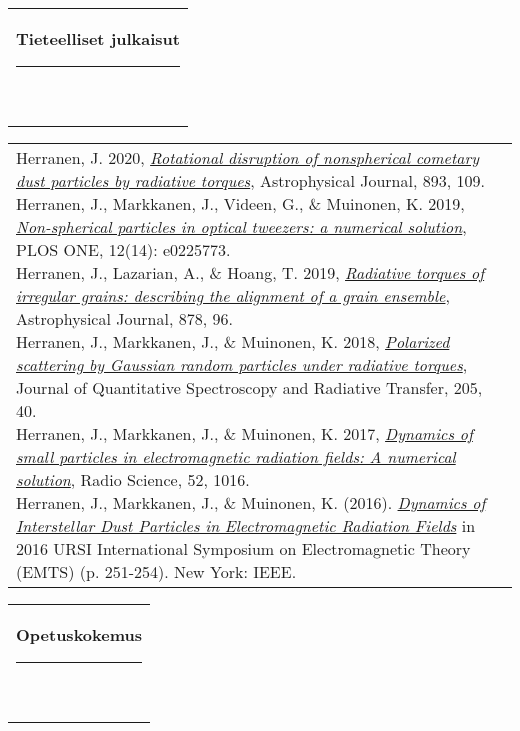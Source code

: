 \documentclass[11pt,A4]{article}
\newcommand{\mpwidth}{\linewidth-\fboxsep-\fboxsep}
\newcommand{\cvtext}[1] {
	\begin{tabular*}{1\mpwidth}{p{0.98\mpwidth}}
		\parbox{1\mpwidth}{#1}
	\end{tabular*}
}
\newcommand{\cvsection}[1] {
	\vspace{14pt}
	\cvtext{
		\textbf{\LARGE{\textcolor{darkcol}{{#1}}}}\\[-4pt]
		\textcolor{maincol}{ \rule{0.1\textwidth}{2pt} } \\
	}
}
\begin{document}
\begin{paracol}{2}
\begin{rightcolumn}
			\newpage
			\cvsection{Tieteelliset julkaisut}
			
			\cvtext{
				
				Herranen, J. 2020, \emph{\href{https://doi.org/10.3847/1538-4357/ab8009}{Rotational disruption of nonspherical cometary dust particles by radiative torques}}, Astrophysical Journal, 893, 109. \\[-5pt]
				
				Herranen, J., Markkanen, J., Videen, G., \& Muinonen, K. 2019, \emph{\href{https://doi.org/10.1371/journal.pone.0225773}{Non-spherical particles in optical tweezers: a numerical solution}}, PLOS ONE, 12(14): e0225773.\\[-5pt]
				
				Herranen, J., Lazarian, A., \& Hoang, T. 2019, \emph{\href{https://doi.org/10.3847\%2F1538-4357\%2Fab1eb3}{Radiative torques of irregular grains: describing the alignment of a grain ensemble}}, Astrophysical Journal, 878, 96.\\[-5pt]
				
				Herranen, J., Markkanen, J., \& Muinonen, K. 2018, \emph{\href{https://doi.org/10.1016/j.jqsrt.2017.09.033}{Polarized scattering by Gaussian random particles under radiative torques}}, Journal of Quantitative Spectroscopy and Radiative Transfer, 205, 40.\\[-5pt]
				
				Herranen, J., Markkanen, J., \& Muinonen, K. 2017, \emph{\href{https://doi.org/10.1002/2017RS006333}{Dynamics of small particles in electromagnetic radiation fields: A numerical solution}}, Radio Science, 52, 1016.\\[-5pt]
				
				Herranen, J., Markkanen, J., \& Muinonen, K. (2016). \emph{\href{https://doi.org/10.1109/URSI-EMTS.2016.7571366}{Dynamics of Interstellar Dust Particles in Electromagnetic Radiation Fields}} in 2016 URSI International Symposium on Electromagnetic Theory (EMTS) (p. 251-254). New York: IEEE.
				
			}
		
			\cvsection{Opetuskokemus}
			

\end{rightcolumn}
\end{paracol}
\end{document}
